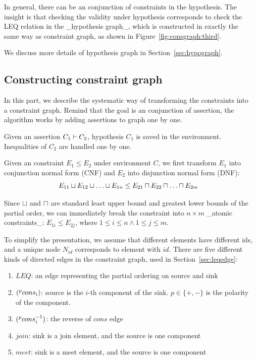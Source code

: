 In general, there can be an conjunction of constraints in the
hypothesis. The insight is that checking the validity under hypothesis
corresponds to check the LEQ relation in the _hypothesis graph_, which
is constructed in exactly the same way as constraint graph, as shown
in Figure~\ref{fig:consgraph:third}. 

We discuss more details of hypothesis graph in
Section~\ref{sec:hypograph}.

\subsection{Constructing constraint graph}
\label{sec:consgraph}

In this part, we describe the systematic way of transforming the constraints
into a constraint graph. Remind that the goal is an conjunction of assertion,
the algorithm works by adding assertions to graph one by one.

Given an assertion $C_1 \vdash C_2$, hypothesis $C_1$ is saved in the
environment. Inequalities of $C_2$ are handled one by one.

Given an constraint $E_1 \leq E_2$ under environment $C$, we first transform
$E_1$ into conjunction normal form (CNF) and $E_2$ into disjunction normal form
(DNF): 
\[E_{11}\join E_{12} \join \dots \join E_{1n} \leq E_{21}\meet E_{22}
\meet \dots \meet E_{2m}\]

Since $\sqcup$ and $\sqcap$ are standard least upper bound and greatest lower
bounds of the partial order, we can immediately break the constraint into
$n\times m$ _atomic constraints_: $E_{1i}\leq E_{2j}$, where $1\leq i\leq n
\land 1\leq j\leq m$.

To simplify the presentation, we assume that different elements have different
ids, and a unique node $N_{id}$ corresponds to element with $id$. There are
five different kinds of directed edges in the constraint graph, used in
Section~\ref{sec:leqedge}:

\begin{enumerate}
\item $LEQ$: an edge representing the partial ordering on source and sink

\item $(^{p}cons_i)$: source is the $i$-th component of the sink. $p\in
\{+,-\}$ is the polarity of the component.

\item $(^{p}cons_i^{-1})$: the reverse of $cons$ edge

\item $join$: sink is a join element, and the source is one component

\item $meet$: sink is a meet element, and the source is one component

\end{enumerate}

